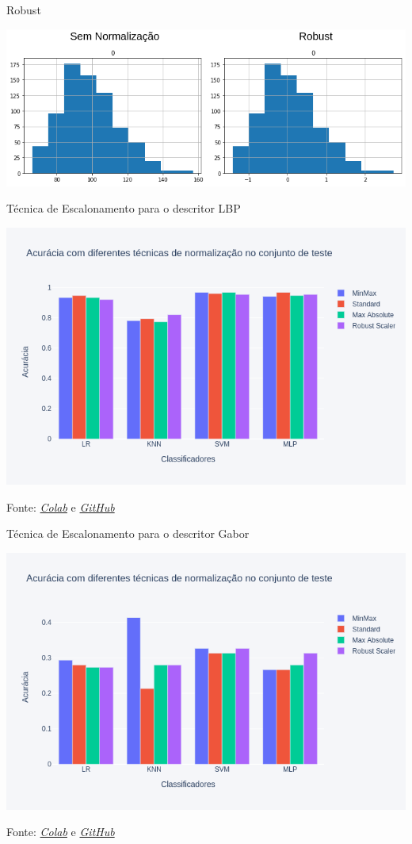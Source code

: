 \begin{frame}{Robust}
\begin{center}
	\includegraphics[width=.9\textwidth,height=.7\textheight]{./fig/sem_rbt.png}
\end{center}
\end{frame}

\begin{frame}{Técnica de Escalonamento para o descritor LBP}
\begin{center}
	\includegraphics[width=.8\textwidth,height=.7\textheight]{./fig/bar_norm_all_lbp.png}
\end{center}
Fonte: \emph{\textcolor{blue}{\href{https://colab.research.google.com/drive/15Ozutw22u9wfAXisgqfhmA33P3s0fbWp?usp=sharing}{Colab}}}
e
\emph{\textcolor{blue}{\href{https://github.com/guimpo/hand_on_again_ai_master/}{GitHub}}}
\end{frame}

\begin{frame}{Técnica de Escalonamento para o descritor Gabor}
\begin{center}
	\includegraphics[width=.8\textwidth,height=.7\textheight]{./fig/bar_norm_all_gabor.png}
\end{center}
Fonte: \emph{\textcolor{blue}{\href{https://colab.research.google.com/drive/15Ozutw22u9wfAXisgqfhmA33P3s0fbWp?usp=sharing}{Colab}}}
e
\emph{\textcolor{blue}{\href{https://github.com/guimpo/hand_on_again_ai_master/}{GitHub}}}
\end{frame}